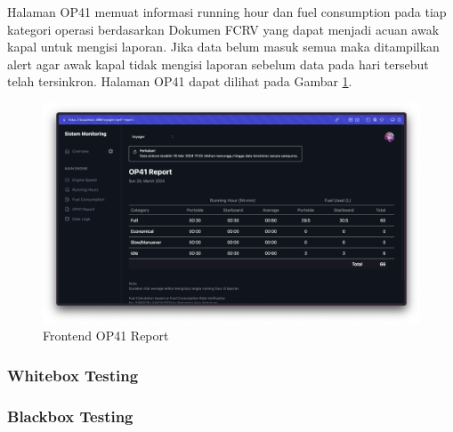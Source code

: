 Halaman OP41 memuat informasi running hour dan fuel consumption pada tiap kategori operasi berdasarkan Dokumen FCRV yang dapat menjadi acuan awak kapal untuk mengisi laporan. Jika data belum masuk semua maka ditampilkan alert agar awak kapal tidak mengisi laporan sebelum data pada hari tersebut telah tersinkron. Halaman OP41 dapat dilihat pada Gambar \ref{fig:fe-op41}.

\begin{figure}[!h]
    \includegraphics[width=1\linewidth, center]{images/hasil/iterations/5/fe-op41.png}
    \caption{Frontend OP41 Report}
    \label{fig:fe-op41}
\end{figure}

\newpage

\subsubsection{Whitebox Testing}

\begin{landscape}
    \subsubsection{Blackbox Testing}

    
    \newpage
    

\end{landscape}